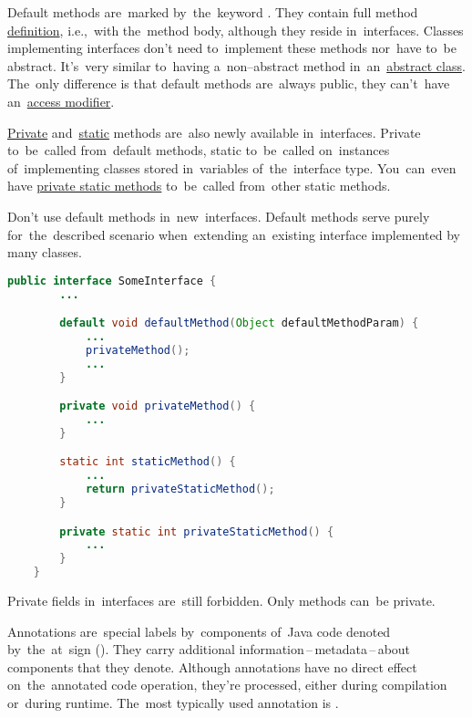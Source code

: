 Default methods are~marked by~the~keyword .
They contain full method \hyperref[declarationdefinition]{definition}, i.e.,~with the~method body, although they reside in~interfaces.
Classes implementing interfaces don't need to~implement these methods nor~have to~be abstract.
It's~very similar to~having a~non--abstract method in~an~\hyperref[javaabstractclasses]{abstract class}.
The~only difference is that default methods are~always public, they can't~have an~\hyperref[javaaccessmodifiers]{access modifier}.

\hyperref[javaprivate]{Private} and~\hyperref[javastatic]{static} methods are~also newly available in~interfaces.
Private to~be~called from~default methods, static to~be~called on~instances of~implementing classes stored in~variables of~the~interface type.
You~can~even have \hyperref[javaprivatestaticmethods]{private static methods} to~be~called from~other static methods.

\warning Don't use default methods in~new~interfaces.
Default methods serve purely for~the~described scenario when~extending an~existing interface implemented by many classes.

\begin{lstlisting}[language=Java]
    public interface SomeInterface {
        ...

        default void defaultMethod(Object defaultMethodParam) {
            ...
            privateMethod();
            ...
        }

        private void privateMethod() {
            ...
        }

        static int staticMethod() {
            ...
            return privateStaticMethod();
        }

        private static int privateStaticMethod() {
            ...
        }
    }
\end{lstlisting}

\note Private fields in~interfaces are~still forbidden.
Only methods can~be private.
\newpage

\label{javaannotation}
Annotations are~special labels by~components of~Java code denoted by~the~at~sign ().
They carry additional information\,--\,metadata\,--\,about components that they denote.
Although annotations have no direct effect on~the~annotated code operation, they're processed, either during compilation or~during runtime.
The~most typically used annotation is \hyperref[javaoverride]{}.

